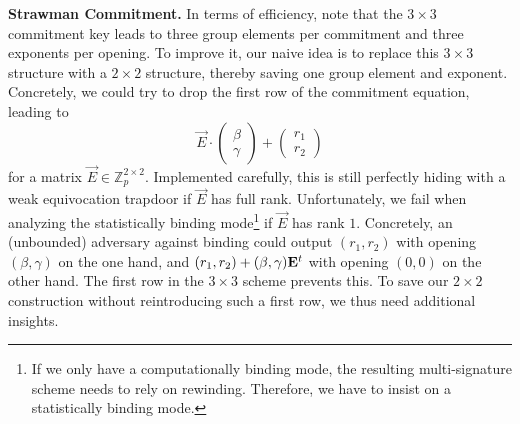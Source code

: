 \documentclass[version=final]{iacrcc}
\theoremstyle{mytheorem}				\newtheorem{theorem}{Theorem}
\theoremstyle{myplain}
\theoremstyle{mydefinition}
\theoremstyle{myremark}
\newcommand{\ZZ}{\mathbb{Z}}
\begin{document}
\smallskip\noindent\textbf{Strawman Commitment.}
In terms of efficiency, note that the $3 \times 3$ commitment key leads to three group elements per commitment and three exponents per opening.
To improve it, our naive idea is to replace this $3 \times 3$ structure with a $2\times 2$ structure, thereby saving one group element and exponent.
Concretely, we could try to drop the first row of the commitment equation, leading to 
	\[
		\vec{E}\cdot \begin{pmatrix}\beta \\ \gamma\end{pmatrix}  + \begin{pmatrix}r_1 \\ r_2\end{pmatrix}
	\] for a matrix $\vec{E} \in \ZZ_p^{2\times 2}$. 
Implemented carefully, this is still perfectly hiding with a weak equivocation trapdoor if $\vec{E}$ has full rank.
Unfortunately, we fail when analyzing the statistically binding mode\footnote{If we only have a computationally binding mode, the resulting multi-signature scheme needs to rely on rewinding.
Therefore, we have to insist on a statistically binding mode.} if $\vec{E}$ has rank $1$.
Concretely, an (unbounded) adversary against binding could output $(r_1,r_2)$ with opening $(\beta,\gamma)$ on the one hand, and $(r_1,r_2) + (\beta,\gamma)\mathbf{E}^{t}$ with opening $(0,0)$ on the other hand.
The first row in the $3\times 3$ scheme prevents this.
To save our $2\times 2$ construction without reintroducing such a first row, we thus need additional insights.
\end{document}
